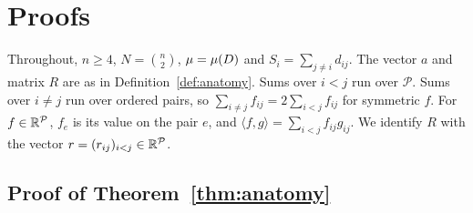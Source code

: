 \providecommand{\Pairs}{\mathcal{P}}
\providecommand{\SNDdes}{\mathrm{SND}_{\mathrm{des}}}
\providecommand{\sigmamain}{\sigma^2_{\mathrm{main}}}
\providecommand{\sigmaint}{\sigma^2_{\mathrm{int}}}
\providecommand{\sigmatot}{\sigma^2_{\mathrm{tot}}}
\providecommand{\one}{\mathbf{1}}
\providecommand{\Sym}{\mathfrak{S}}
\renewenvironment{proof}[1][Proof]{\par\noindent{\bfseries #1\ }\ignorespaces}{\leavevmode\unskip\penalty9999\hbox{}\nobreak\hfill\quad\hbox{\BlackBox}\par\vspace{2mm}}

\section{Proofs}
\label{app:proofs}

Throughout, $n\ge4$, $N=\binom n2$, $\mu=\mu(D)$ and $S_i=\sum_{j\neq i}d_{ij}$.
The vector $a$ and matrix $R$ are as in Definition~\ref{def:anatomy}. Sums over
$i<j$ run over $\Pairs$. Sums over $i\neq j$ run over ordered pairs, so
$\sum_{i\neq j}f_{ij}=2\sum_{i<j}f_{ij}$ for symmetric $f$. For
$f\in\R^{\Pairs}$, $f_e$ is its value on the pair $e$, and
$\langle f,g\rangle=\sum_{i<j}f_{ij}g_{ij}$. We identify $R$ with the vector
$r=(r_{ij})_{i<j}\in\R^{\Pairs}$.

\subsection{Proof of Theorem~\ref{thm:anatomy}}
\label{app:anatomy}

